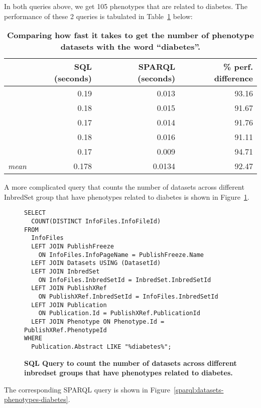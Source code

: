 In both queries above, we get 105 phenotypes that are related to diabetes.  The performance of these 2 queries is tabulated in Table~\ref{table:perf-2} below:

\begin{table}[H]
\begin{tabular}{r|rr|r}
& SQL (seconds) & SPARQL (seconds) & \% perf. difference\\[0pt]
\toprule
& 0.19 & 0.013 & 93.16\\[0pt]
& 0.18 & 0.015 & 91.67\\[0pt]
& 0.17 & 0.014 & 91.76\\[0pt]
& 0.18 & 0.016 & 91.11\\[0pt]
& 0.17 & 0.009 & 94.71\\[0pt]
\toprule
\textit{mean} & 0.178 & 0.0134 & 92.47\\[0pt]
\end{tabular}
\caption[Performance comparison in seconds: phenotype datasets related to diabetes (SQL vs SPARQL)]{\textbf{Comparing how fast it takes to get the number of phenotype datasets with the word ``diabetes''.}}\label{table:perf-2}
\end{table}

A more complicated query that counts the number of datasets across different InbredSet group that have phenotypes related to diabetes is shown in Figure~\ref{sql:datasets-phenotypes-diabetes}.

\begin{figure}[H]
\centering
\begin{verbatim}
SELECT 
  COUNT(DISTINCT InfoFiles.InfoFileId) 
FROM 
  InfoFiles 
  LEFT JOIN PublishFreeze
    ON InfoFiles.InfoPageName = PublishFreeze.Name 
  LEFT JOIN Datasets USING (DatasetId)
  LEFT JOIN InbredSet
    ON InfoFiles.InbredSetId = InbredSet.InbredSetId 
  LEFT JOIN PublishXRef
    ON PublishXRef.InbredSetId = InfoFiles.InbredSetId 
  LEFT JOIN Publication
    ON Publication.Id = PublishXRef.PublicationId 
  LEFT JOIN Phenotype ON Phenotype.Id = PublishXRef.PhenotypeId 
WHERE 
  Publication.Abstract LIKE "%diabetes%";
\end{verbatim}
\caption[SQL query to count diabetes-related phenotype datasets across different inbredset groups]{\textbf{SQL Query to count the number of datasets across different inbredset groups that have phenotypes related to diabetes.}}\label{sql:datasets-phenotypes-diabetes}
\end{figure}

The corresponding SPARQL query is shown in Figure~\ref{sparql:datasets-phenotypes-diabetes}.


